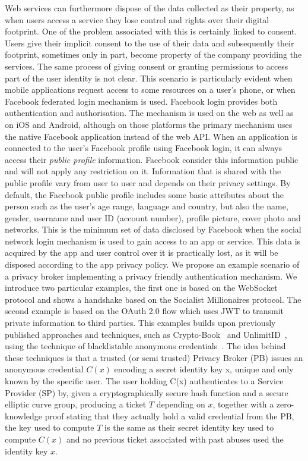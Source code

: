 Web services can furthermore dispose of the data collected as their property, as when users access a service they lose control and rights over their digital footprint. One of the problem associated with this is certainly linked to consent. Users give their implicit consent to the use of their data and subsequently their footprint, sometimes only in part, become property of the company providing the services. The same process of giving consent or granting permissions to access part of the user identity is not clear. This scenario is particularly evident when mobile applications request access to some resources on a user's phone, or when Facebook federated login mechanism is used. Facebook login provides both authentication and authorisation. The mechanism is used on the web as well as on iOS and Android, although on those platforms the primary mechanism uses the native Facebook application instead of the web API. When an application is connected to the user's Facebook profile using Facebook login, it can always access their \emph{public profile} information. Facebook consider this information public and will not apply any restriction on it. Information that is shared with the public profile vary from user to user and depends on their privacy settings. By default, the Facebook public profile includes some basic attributes about the person such as the user's age range, language and country, but also the name, gender, username and user ID (account number), profile picture, cover photo and networks. This is the minimum set of data disclosed by Facebook when the social network login mechanism is used to gain access to an app or service. This data is acquired by the app and user control over it is practically lost, as it will be disposed according to the app privacy policy.
We propose an example scenario of a privacy broker implementing a privacy friendly authentication mechanism. We introduce two particular examples, the first one is based on the WebSocket protocol and shows a handshake based on the Socialist Millionaires protocol. The second example is based on the OAuth 2.0 flow which uses JWT to transmit private information to third parties. This examples builds upon previously published approaches and techniques, such as Crypto-Book~\cite{maheswaran2013crypto} and UnlimitID~\cite{isaakidis2016unlimitid}, using the technique of blacklistable anonymous credentials~\cite{tsang2007blacklistable}. The idea behind these techniques is that a trusted (or semi trusted) Privacy Broker (PB) issues an anonymous credential $C(x)$ encoding a secret identity key x, unique and only known by the specific user. The user holding C(x) authenticates to a Service Provider (SP) by, given a cryptographically secure hash function and a secure elliptic curve group, producing a ticket $T$ depending on $x$, together with a zero-knowledge proof stating that they actually hold a valid credential from the PB, the key used to compute $T$ is the same as their secret identity key used to compute $C(x)$ and no previous ticket associated with past abuses used the identity key $x$. 
